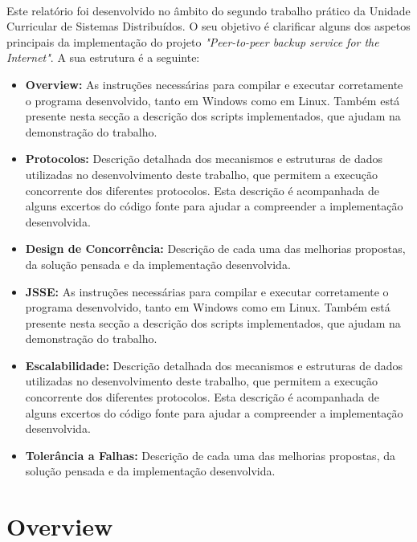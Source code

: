 \documentclass[11pt,oneside]{book}
\begin{document}
\paragraph{}
Este relatório foi desenvolvido no âmbito do segundo trabalho prático da 
Unidade Curricular de Sistemas Distribuídos. O seu objetivo é clarificar 
alguns dos aspetos principais da implementação do projeto 
\textit{"Peer-to-peer backup service for the Internet"}. A sua estrutura é a 
seguinte:
\begin{itemize}
    \item \textbf{Overview:} As instruções necessárias
    para compilar e executar corretamente o programa desenvolvido, tanto em Windows
    como em Linux. Também está presente nesta secção a descrição dos scripts 
    implementados, que ajudam na demonstração do trabalho.
    \item \textbf{Protocolos:} Descrição detalhada dos
    mecanismos e estruturas de dados utilizadas no desenvolvimento deste trabalho, 
    que permitem a execução concorrente dos diferentes protocolos. Esta descrição é
    acompanhada de alguns excertos do código fonte para ajudar a compreender a 
    implementação desenvolvida.
    \item \textbf{Design de Concorrência:} Descrição de cada uma das melhorias 
    propostas, da solução pensada e da implementação desenvolvida.
    \item \textbf{JSSE:} As instruções necessárias
    para compilar e executar corretamente o programa desenvolvido, tanto em Windows
    como em Linux. Também está presente nesta secção a descrição dos scripts 
    implementados, que ajudam na demonstração do trabalho.
    \item \textbf{Escalabilidade:} Descrição detalhada dos
    mecanismos e estruturas de dados utilizadas no desenvolvimento deste trabalho, 
    que permitem a execução concorrente dos diferentes protocolos. Esta descrição é
    acompanhada de alguns excertos do código fonte para ajudar a compreender a 
    implementação desenvolvida.
    \item \textbf{Tolerância a Falhas:} Descrição de cada uma das melhorias 
    propostas, da solução pensada e da implementação desenvolvida.
\end{itemize}     

\pagebreak

\section{Overview}
\end{document}

